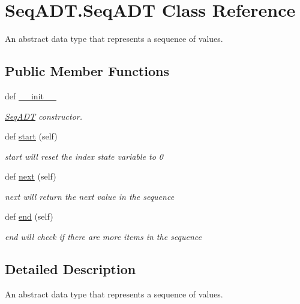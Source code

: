 \hypertarget{class_seq_a_d_t_1_1_seq_a_d_t}{}\section{Seq\+A\+D\+T.\+Seq\+A\+DT Class Reference}
\label{class_seq_a_d_t_1_1_seq_a_d_t}


An abstract data type that represents a sequence of values.  


\subsection*{Public Member Functions}
\begin{DoxyCompactItemize}
\item 
def \hyperlink{class_seq_a_d_t_1_1_seq_a_d_t_a0a2cd3b0428cb4bf15c2f7ea2bd454cf}{\+\_\+\+\_\+init\+\_\+\+\_\+}
\begin{DoxyCompactList}\small\item\em \hyperlink{class_seq_a_d_t_1_1_seq_a_d_t}{Seq\+A\+DT} constructor. \end{DoxyCompactList}\item 
\mbox{\label{class_seq_a_d_t_1_1_seq_a_d_t_ad89d5ccf139e928a65000f00e605692e}} 
def \hyperlink{class_seq_a_d_t_1_1_seq_a_d_t_ad89d5ccf139e928a65000f00e605692e}{start} (self)
\begin{DoxyCompactList}\small\item\em start will reset the index state variable to 0 \end{DoxyCompactList}\item 
def \hyperlink{class_seq_a_d_t_1_1_seq_a_d_t_a1d2ee97ccd784507ae32c00150dc6fb0}{next} (self)
\begin{DoxyCompactList}\small\item\em next will return the next value in the sequence \end{DoxyCompactList}\item 
def \hyperlink{class_seq_a_d_t_1_1_seq_a_d_t_a7d8df17dae5df548ca32054075ca04b8}{end} (self)
\begin{DoxyCompactList}\small\item\em end will check if there are more items in the sequence \end{DoxyCompactList}\end{DoxyCompactItemize}


\subsection{Detailed Description}
An abstract data type that represents a sequence of values. 

